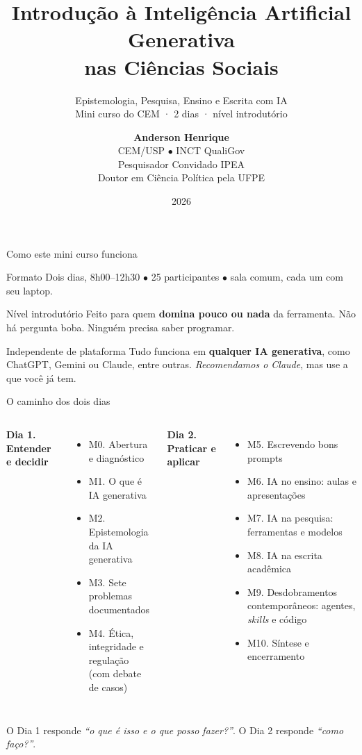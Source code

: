 \documentclass[11pt,aspectratio=169,t]{beamer}
\title[Introdução à IAG — Mini curso CEM]{Introdução à Inteligência Artificial Generativa\\
\large nas Ciências Sociais}
\subtitle{Epistemologia, Pesquisa, Ensino e Escrita com IA \\ \small Mini curso do CEM · 2 dias · nível introdutório}
\author[Anderson Henrique]{\textbf{Anderson Henrique}\\
\small CEM/USP $\bullet$ INCT QualiGov\\
\small Pesquisador Convidado IPEA\\
\small Doutor em Ciência Política pela UFPE}
\institute{}
\date{2026}
\begin{document}
\begin{frame}[plain]
  \titlepage
\end{frame}

\begin{frame}{Como este mini curso funciona}
  \begin{block}{Formato}
    Dois dias, 8h00--12h30 $\bullet$ 25 participantes $\bullet$ sala comum, cada um com seu laptop.
  \end{block}
  \pause
  \begin{alertblock}{Nível introdutório}
    Feito para quem \textbf{domina pouco ou nada} da ferramenta. Não há pergunta boba. Ninguém precisa saber programar.
  \end{alertblock}
  \pause
  \begin{exampleblock}{Independente de plataforma}
    Tudo funciona em \textbf{qualquer IA generativa}, como ChatGPT, Gemini ou Claude, entre outras. \textit{Recomendamos o Claude}, mas use a que você já tem.
  \end{exampleblock}
\end{frame}

\begin{frame}{O caminho dos dois dias}
  \footnotesize
  \begin{columns}[t]
    \textbf{\color{azulUNI}Dia 1. Entender e decidir}
    \begin{itemize}
      \item M0. Abertura e diagnóstico
      \item M1. O que é IA generativa
      \item M2. Epistemologia da IA generativa
      \item M3. Sete problemas documentados
      \item M4. Ética, integridade e regulação \\ \scriptsize (com debate de casos)
    \end{itemize}
    \textbf{\color{azulUNI}Dia 2. Praticar e aplicar}
    \begin{itemize}
      \item M5. Escrevendo bons prompts
      \item M6. IA no ensino: aulas e apresentações
      \item M7. IA na pesquisa: ferramentas e modelos
      \item M8. IA na escrita acadêmica
      \item M9. Desdobramentos contemporâneos: agentes, \textit{skills} e código
      \item M10. Síntese e encerramento
    \end{itemize}
  \end{columns}
  \vfill
  \begin{block}{}
    \centering O Dia 1 responde \textit{``o que é isso e o que posso fazer?''}. O Dia 2 responde \textit{``como faço?''}.
  \end{block}
\end{frame}
\end{document}
